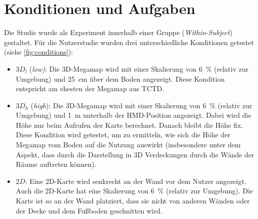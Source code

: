 \section{Konditionen und Aufgaben}
\label{sec:conditions_and_tasks}
Die Studie wurde als Experiment innerhalb einer Gruppe (\emph{Within-Subject}) gestaltet.
Für die Nutzerstudie wurden drei unterschiedliche Konditionen getestet (siehe \autoref{fig:conditions}):
\begin{itemize}
    \item $3D_l$ (\emph{low)}: Die 3D-Megamap wird mit einer Skalierung von \SI{6}{\percent} (relativ zur Umgebung) und \SI{25}{\cm} über dem Boden angezeigt.
    Diese Kondition entspricht am ehesten der Megamap aus TCTD. 
    \item $3D_h$ (\emph{high}): Die 3D-Megamap wird mit einer Skalierung von \SI{6}{\percent} (relativ zur Umgebung) und \SI{1}{\metre} unterhalb der HMD-Position angezeigt.
    Dabei wird die Höhe nur beim Aufrufen der Karte berechnet.
    Danach bleibt die Höhe fix.
    Diese Kondition wird getestet, um zu ermitteln, wie sich die Höhe der Megamap vom Boden auf die Nutzung auswirkt (insbesondere unter dem Aspekt, dass durch die Darstellung in 3D Verdeckungen durch die Wände der Räume auftreten können).
    \item $2D$: Eine 2D-Karte wird senkrecht an der Wand vor dem Nutzer angezeigt.
    Auch die 2D-Karte hat eine Skalierung von \SI{6}{\percent} (relativ zur Umgebung).
    Die Karte ist so an der Wand platziert, dass sie nicht von anderen Wänden oder der Decke und dem Fußboden geschnitten wird.
\end{itemize}
